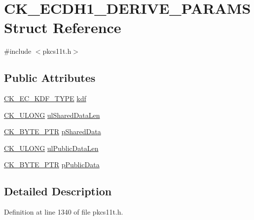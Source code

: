 \hypertarget{struct_c_k___e_c_d_h1___d_e_r_i_v_e___p_a_r_a_m_s}{}\section{C\+K\+\_\+\+E\+C\+D\+H1\+\_\+\+D\+E\+R\+I\+V\+E\+\_\+\+P\+A\+R\+A\+MS Struct Reference}
\label{struct_c_k___e_c_d_h1___d_e_r_i_v_e___p_a_r_a_m_s}


{\ttfamily \#include $<$pkcs11t.\+h$>$}

\subsection*{Public Attributes}
\begin{DoxyCompactItemize}
\item 
\hyperlink{pkcs11t_8h_a25c4c2080a9de6b88ec16c6e9c776e56}{C\+K\+\_\+\+E\+C\+\_\+\+K\+D\+F\+\_\+\+T\+Y\+PE} \hyperlink{struct_c_k___e_c_d_h1___d_e_r_i_v_e___p_a_r_a_m_s_a41b07bdfaafe367160d98f436aab63d8}{kdf}
\item 
\hyperlink{pkcs11t_8h_a35181858a3b7a0a81f49d180d8f446ef}{C\+K\+\_\+\+U\+L\+O\+NG} \hyperlink{struct_c_k___e_c_d_h1___d_e_r_i_v_e___p_a_r_a_m_s_a02d6c1c7d1eef23185b8724d2747ed99}{ul\+Shared\+Data\+Len}
\item 
\hyperlink{pkcs11t_8h_a3d7233a4077fbaf7ae76b64da0a62a21}{C\+K\+\_\+\+B\+Y\+T\+E\+\_\+\+P\+TR} \hyperlink{struct_c_k___e_c_d_h1___d_e_r_i_v_e___p_a_r_a_m_s_add79222389080ea155a4ad9d36a3e772}{p\+Shared\+Data}
\item 
\hyperlink{pkcs11t_8h_a35181858a3b7a0a81f49d180d8f446ef}{C\+K\+\_\+\+U\+L\+O\+NG} \hyperlink{struct_c_k___e_c_d_h1___d_e_r_i_v_e___p_a_r_a_m_s_af06ac27a02189f096fd840e0e27e58c4}{ul\+Public\+Data\+Len}
\item 
\hyperlink{pkcs11t_8h_a3d7233a4077fbaf7ae76b64da0a62a21}{C\+K\+\_\+\+B\+Y\+T\+E\+\_\+\+P\+TR} \hyperlink{struct_c_k___e_c_d_h1___d_e_r_i_v_e___p_a_r_a_m_s_a73705855f1dceeed1af8180dd4f54ce0}{p\+Public\+Data}
\end{DoxyCompactItemize}


\subsection{Detailed Description}


Definition at line 1340 of file pkcs11t.\+h.



